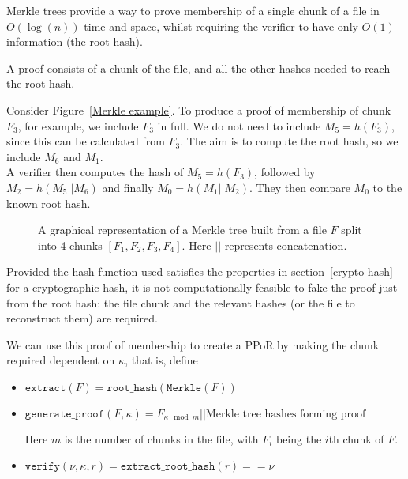 \documentclass[12pt,a4paper,twoside,openright]{report}
\begin{document}
Merkle trees provide a way to prove membership of a single chunk of a file in $O(\log(n))$ time and space,
whilst requiring the verifier to have only $O(1)$ information (the root hash).

A proof consists of a chunk of the file, and all the other hashes needed to reach the root hash.

Consider Figure~\ref{Merkle example}.
To produce a proof of membership of chunk $F_3$, for example, we include $F_3$ in full.
We do not need to include $M_5 = h(F_3)$, since this can be calculated from $F_3$.
The aim is to compute the root hash, so we include $M_6$ and $M_1$.\\
A verifier then computes the hash of $M_5 = h(F_3)$, followed by $M_2 = h(M_5 || M_6)$
and finally $M_0 = h(M_1 || M_2)$. They then compare $M_0$ to the known root hash.

\begin{figure}[h]
\centering
{}

\caption[A Merkle Tree proof of membership]{A graphical representation of a Merkle tree built from a file $F$ split into 4 chunks $[F_1, F_2, F_3, F_4]$.
Here $||$ represents concatenation.}

\label{Merkle proof}
\end{figure}


Provided the hash function used satisfies the properties in section~\ref{crypto-hash}
for a cryptographic hash, it is not computationally feasible to fake the proof just from the root hash: the file chunk and the relevant hashes (or the file to reconstruct them) are required.

We can use this proof of membership to create a PPoR by making the chunk required dependent on $\kappa$, that is, define
\begin{itemize}
\item $\texttt{extract}(F) = \texttt{root\_hash}(\texttt{Merkle}(F))$


\item $\texttt{generate\_proof}(F, \kappa) =
F_{\kappa \mod m} || \text{Merkle tree hashes forming proof}$

Here $m$ is the number of chunks in the file, with $F_i$ being the $i$th chunk of $F$.

\item $\texttt{verify}(\nu, \kappa, r) =
\texttt{extract\_root\_hash}(r) == \nu$
\end{itemize}
\end{document}

